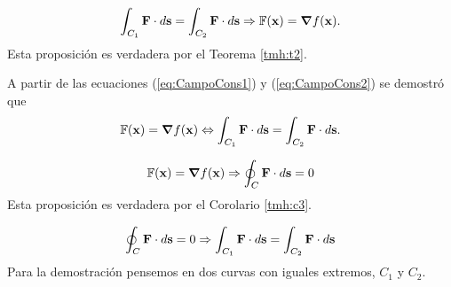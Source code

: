 \begin{theorem}
    \begin{equation}
        \int_{C_1}\mathbf{F}\cdot d\mathbf{s}=\int_{C_2}\mathbf{F}\cdot d\mathbf{s} \Rightarrow \mathbb{F}(\mathbf{x})=\grad f(\mathbf{x}).
        \label{eq:CampoCons2}
    \end{equation}
    Esta proposición es verdadera por el Teorema \ref{tmh:t2}.

    A partir de las ecuaciones (\ref{eq:CampoCons1}) y (\ref{eq:CampoCons2}) se demostró que
    \begin{equation}
        \mathbb{F}(\mathbf{x})=\grad f(\mathbf{x}) \Leftrightarrow \int_{C_1}\mathbf{F}\cdot d\mathbf{s}=\int_{C_2}\mathbf{F}\cdot d\mathbf{s}.
        \label{eq:CampoCons1y2}
    \end{equation}

    \begin{equation}
        \mathbb{F}(\mathbf{x})=\grad f(\mathbf{x}) \Rightarrow \oint_C\mathbf{F}\cdot d\mathbf{s}=0
        \label{eq:CampoCons3}
    \end{equation}
    Esta proposición es verdadera por el Corolario \ref{tmh:c3}.

    \begin{equation}
        \oint_C\mathbf{F}\cdot d\mathbf{s}=0 \Rightarrow \int_{C_1}\mathbf{F}\cdot d\mathbf{s}=\int_{C_2}\mathbf{F}\cdot d\mathbf{s}
        \label{eq:CampoCons4}
    \end{equation}
    Para la demostración pensemos en dos curvas con iguales extremos, $C_1$ y $C_2$.
    \begin{figure}[H]
        \begin{center}
\end{center}
\end{figure}
\end{theorem}
